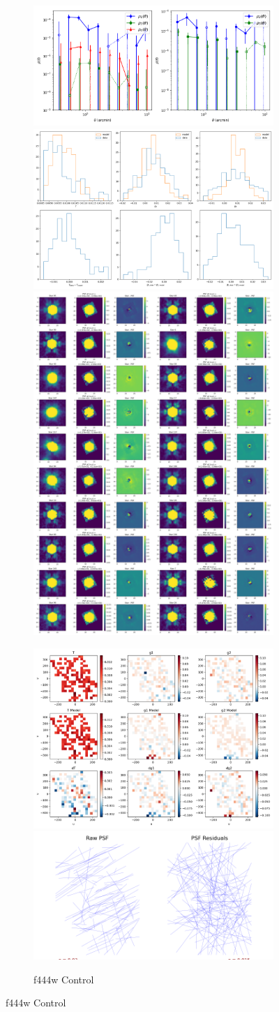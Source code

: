 \documentclass[a4 paper]{article}
\numberwithin{equation}{section}
\newcommand{\0}{\mathbf{0}}
\begin{document}
\begin{figure}[!]
  \begin{subfigure}{\linewidth}
  \includegraphics[width=.3\linewidth]{444wControl/piff_rho.png}\hfill
  \includegraphics[width=.3\linewidth]{444wControl/piff_shapes.png}\hfill
  \includegraphics[width=.3\linewidth]{444wControl/piff_stars.png}
  \end{subfigure}\par\medskip
  \begin{subfigure}{\linewidth}
  \includegraphics[width=.3\linewidth]{444wControl/piff_twod.png}\hfill
  \includegraphics[width=.3\linewidth]{444wControl/piff_whisker.png}\hfill
  \caption{f444w Control}
  \end{subfigure}\par\medskip


\end{figure}
\newpage
\end{document}
